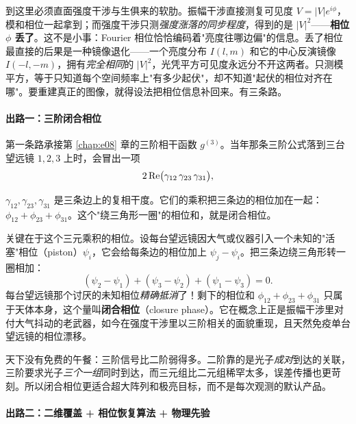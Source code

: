 到这里必须直面强度干涉与生俱来的软肋。振幅干涉直接测复可见度 \(V=|V|e^{i\phi}\)，模和相位一起拿到；而强度干涉只测\emph{强度涨落的同步程度}，得到的是 \(|V|^2\)——\textbf{相位 \(\phi\) 丢了}。这不是小事：Fourier 相位恰恰编码着"亮度往哪边偏"的信息。丢了相位最直接的后果是一种镜像退化——一个亮度分布 \(I(l,m)\) 和它的中心反演镜像 \(I(-l,-m)\)，拥有\emph{完全相同}的 \(|V|^2\)，光凭平方可见度永远分不开这两者。只测模平方，等于只知道每个空间频率上"有多少起伏"，却不知道"起伏的相位对齐在哪"。要重建真正的图像，就得设法把相位信息补回来。有三条路。

\paragraph{出路一：三阶闭合相位}
\label{sec:e11-closure}

第一条路承接第 \ref{chap:e08} 章的三阶相干函数 \(g^{(3)}\)。当年那条三阶公式落到三台望远镜 \(1,2,3\) 上时，会冒出一项
\begin{equation}
  2\,{\rm Re}\big(\gamma_{12}\,\gamma_{23}\,\gamma_{31}\big),
  \label{eq:e11-triple}
\end{equation}
\begin{formulaexplain}
\(\gamma_{12},\gamma_{23},\gamma_{31}\) 是三条边上的复相干度。它们的乘积把三条边的相位加在一起：\(\phi_{12}+\phi_{23}+\phi_{31}\)。这个"绕三角形一圈"的相位和，就是闭合相位。
\end{formulaexplain}
关键在于这个三元乘积的相位。设每台望远镜因大气或仪器引入一个未知的"活塞"相位（piston）\(\psi_i\)，它会给每条边的相位加上 \(\psi_j-\psi_i\)。把三条边绕三角形转一圈相加：
\[
  (\psi_2-\psi_1)+(\psi_3-\psi_2)+(\psi_1-\psi_3)=0.
\]
每台望远镜那个讨厌的未知相位\emph{精确抵消}了！剩下的相位和 \(\phi_{12}+\phi_{23}+\phi_{31}\) 只属于天体本身，这个量叫\textbf{闭合相位}（closure phase）。它在概念上正是振幅干涉里对付大气抖动的老武器，如今在强度干涉里以三阶相关的面貌重现，且天然免疫单台望远镜的相位漂移。

天下没有免费的午餐：三阶信号比二阶弱得多。二阶靠的是光子\emph{成对}到达的关联，三阶要求光子\emph{三个一组}同时到达，而三元组比二元组稀罕太多，误差传播也更苛刻。所以闭合相位更适合超大阵列和极亮目标，而不是每次观测的默认产品。

\paragraph{出路二：二维覆盖 + 相位恢复算法 + 物理先验}
\label{sec:e11-phase-retrieval}

